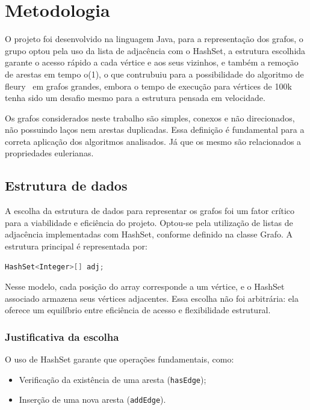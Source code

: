 \documentclass{sbc2023}%
\begin{document}
\section{Metodologia}

O projeto foi desenvolvido na linguagem Java, para a representação dos grafos, o grupo optou pela uso da lista de adjacência com o HashSet, a estrutura escolhida garante o acesso rápido a cada vértice e aos seus vizinhos, e também a remoção de arestas em tempo o(1), o que contrubuiu para a possibilidade do algoritmo de fleury~\citep{AlgoFleury} em grafos grandes, embora o tempo de execução para vértices de 100k tenha sido um desafio mesmo para a estrutura pensada em velocidade.

Os grafos considerados neste trabalho são simples, conexos e não direcionados, não possuindo laços nem arestas duplicadas. Essa definição é fundamental para a correta aplicação dos algoritmos analisados. Já que os mesmo são relacionados a propriedades eulerianas.

\subsection{Estrutura de dados}

A escolha da estrutura de dados para representar os grafos foi um fator crítico para a viabilidade e eficiência do projeto. Optou-se pela utilização de listas de adjacência implementadas com HashSet, conforme definido na classe Grafo.
A estrutura principal é representada por:

\begin{lstlisting}[language=C]
    HashSet<Integer>[] adj;
\end{lstlisting}

Nesse modelo, cada posição do array corresponde a um vértice, e o HashSet associado armazena seus vértices adjacentes. Essa escolha não foi arbitrária: ela oferece um equilíbrio entre eficiência de acesso e flexibilidade estrutural.

\subsubsection{Justificativa da escolha}

O uso de HashSet garante que operações fundamentais, como:
\begin{itemize}
    \item Verificação da existência de uma aresta (\lstinline|hasEdge|);
    \item Inserção de uma nova aresta (\lstinline|addEdge|).
\end{itemize}
\end{document}
